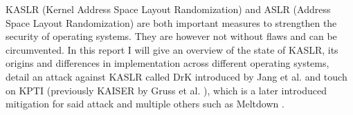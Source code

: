 KASLR (Kernel Address Space Layout Randomization) and ASLR (Address Space Layout Randomization) are both important measures to strengthen the security of operating systems.
They are however not without flaws and can be circumvented.
In this report I will give an overview of the state of KASLR, its origins and differences in implementation across different operating systems, detail an attack against KASLR called DrK introduced by Jang et al. \cite{drk} and touch on KPTI (previously KAISER by Gruss et al. \cite{kaiser}), which is a later introduced mitigation for said attack and multiple others such as Meltdown \cite{meltdown}.
